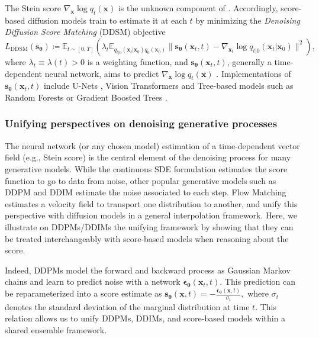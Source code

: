 \documentclass[10pt]{article} %
\newcommand{\DDSM}{\text{DDSM}}
\def\rvs{{\mathbf{s}}}
\def\rvx{{\mathbf{x}}}
\def\vtheta{{\bm{\theta}}}
\def\vepsilon{{\bm{\epsilon}}}
\def\vs{{\bm{s}}}
\begin{document}
The Stein score $\nabla_\rvx \log q_{t}(\rvx)$ is the unknown component of . Accordingly, score-based diffusion models train to estimate it at each $t$ by minimizing the \textit{Denoising Diffusion Score Matching} (DDSM) objective
\begin{equation}\label{eq: score_loss}
 L_{\DDSM}(\vs_\vtheta) \coloneqq \mathbb{E}_{t \sim [0,T]} \left( \lambda_t \mathbb{E}_{q_{t|0}(\rvx_t|\rvx_0)q_0(\rvx_0)}  \| \vs_{\vtheta} (\rvx_t,t) - \nabla_{\rvx_t} \log q_{t|0} (\rvx_t | \rvx_0) \|^2 \right),
\end{equation}
where $\lambda_t \equiv \lambda(t) > 0$ is a weighting function, and $\vs_{\vtheta} (\rvx_t,t)$, generally a time-dependent neural network, aims to predict $ \nabla_\rvx \log q_{t}(\rvx)$ \citep{song2020generativemodelingestimatinggradients}. Implementations of $\rvs_\vtheta(\rvx_t,t)$ include U-Nets \citep{ronneberger2015u}, Vision Transformers \citep{peebles2023scalable} and Tree-based models \citep{jolicoeur2024generating} such as Random Forests \citep{breiman1996bagging} or Gradient Boosted Trees \citep{friedman2000additive}.




\subsubsection{Unifying perspectives on denoising generative processes} \label{section: unifying perspective neural network}

The neural network (or any chosen model) estimation of a time-dependent vector field (e.g., Stein score) is the central element of the denoising process for many generative models. While the continuous SDE formulation estimates the score function \citep{song2021scorebasedgenerativemodelingstochastic} to go to data from noise, other popular generative models such as DDPM \citep{ho2020denoisingdiffusionprobabilisticmodels} and DDIM \citep{song2020denoising} estimate the noise associated to each step. Flow Matching \citep{lipman2022flow} estimates a velocity field to transport one distribution to another, and \citet{albergo2023stochastic} unify this perspective with diffusion models in a general interpolation framework. Here, we illustrate on DDPMs/DDIMs the unifying framework by showing that they can be treated interchangeably with score-based models when reasoning about the score.


Indeed, DDPMs model the forward and backward process as Gaussian Markov chains and learn to predict noise with a network $\vepsilon_{\vtheta}(\rvx_t, t)$. This prediction can be reparameterized into a score estimate as
$\vs_{\vtheta}(\rvx, t) = -\frac{\vepsilon_{\vtheta}(\rvx, t)}{\sigma_t},$
where $\sigma_t$ denotes the standard deviation of the marginal distribution at time $t$. This relation allows us to unify DDPMs, DDIMs, and score-based models within a shared ensemble framework.
\end{document}
